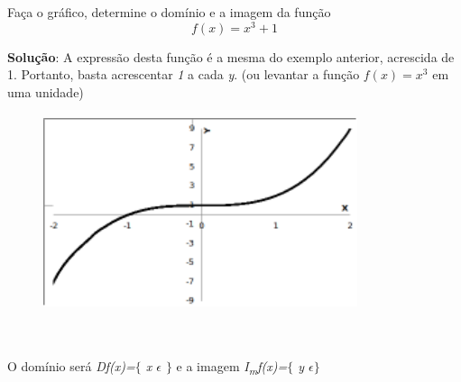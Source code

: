 \begin{texemplo}
Faça o gráfico, determine o domínio e a imagem da função $$ f ( x ) =x^{3}+1 $$

\begin{justify}
\textbf{Solução}: A expressão desta função é a mesma do exemplo anterior, acrescida de 1.
\quad Portanto, basta acrescentar \textit{1} a cada \textit{y}. (ou levantar a função  \( f \left( x \right) =x^{3} \) em uma unidade)
\end{justify}

\begin{figure}[H]
	\begin{Center}
		\includegraphics[width=3.62in,height=2.27in]{capitulos/outras_funcoes/media/image17.pdf}
	\end{Center}
\end{figure}

~~

\begin{justify}
O domínio será \textit{Df(x)=$ \{ $ x $ \epsilon $  \textbf{ }$ \} $ } e a imagem  \textit{I\textsubscript{m}f(x)=$ \{ $ y $ \epsilon \} $ } \qedsymbol{}
\end{justify}
\end{texemplo}


